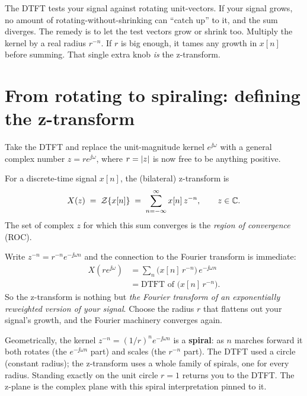 \begin{intuitionbox}
The DTFT tests your signal against rotating unit-vectors. If your signal grows, no
amount of rotating-without-shrinking can ``catch up'' to it, and the sum diverges. The
remedy is to let the test vectors
grow or shrink too. Multiply the kernel by a real radius $r^{-n}$. If $r$
is big enough, it tames any growth in $x[n]$ before summing. That single extra knob
\emph{is} the z-transform.
\end{intuitionbox}

\section{From rotating to spiraling: defining the z-transform}
\label{ch15:ztransform-defn}

Take the DTFT and replace the unit-magnitude kernel $e^{\jj\omega}$ with a general
complex number $z = r e^{\jj\omega}$, where $r=\lvert z\rvert$ is now free to be anything
positive.

\begin{definition}
\label{ch15:def-zt}
For a discrete-time signal $x[n]$, the (bilateral) z-transform is
\[
  X(z) \;=\; \mathcal{Z}\{x[n]\} \;=\; \sum_{n=-\infty}^{\infty} x[n]\, z^{-n},
  \qquad z \in \mathbb{C}.
\]
The set of complex $z$ for which this sum converges is the \emph{region of convergence}
(ROC).
\end{definition}

Write $z^{-n} = r^{-n} e^{-\jj\omega n}$ and the connection to the Fourier transform is immediate:
\begin{align*}
  X(re^{\jj\omega}) &= \sum_{n} \bigl( x[n]\, r^{-n}\bigr)\, e^{-\jj\omega n} \\
  &= \text{DTFT of } \bigl( x[n]\, r^{-n} \bigr).
\end{align*}
So the z-transform is nothing but \emph{the Fourier transform of an exponentially
reweighted version of your signal}. Choose the radius $r$ that flattens out your signal's
growth, and the Fourier machinery converges again.

\begin{happeningbox}
Geometrically, the kernel $z^{-n} = (1/r)^{n} e^{-\jj\omega n}$ is a \textbf{spiral}: as
$n$ marches forward it both rotates (the $e^{-\jj\omega n}$ part) and scales (the
$r^{-n}$ part). The DTFT used a circle (constant radius); the z-transform uses a whole
family of spirals, one for every radius. Standing exactly on the unit circle $r=1$
returns you to the DTFT. The z-plane is the complex plane with this spiral
interpretation pinned to it.
\end{happeningbox}


